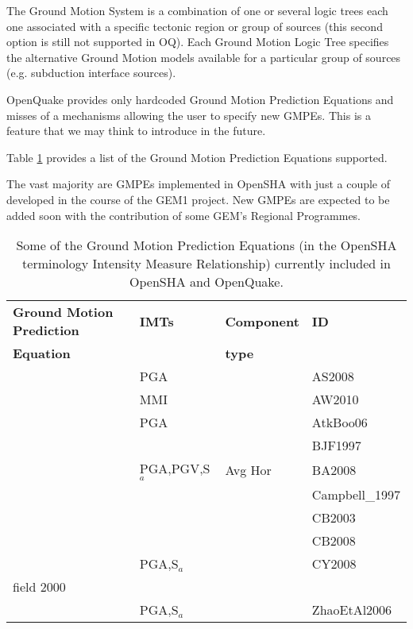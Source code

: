 The Ground Motion System is a combination of one or several logic 
trees each one associated with a specific tectonic region or group 
of sources (this second option is still not supported in OQ).
%
Each Ground Motion Logic Tree specifies the alternative Ground Motion 
models available for a particular group of sources (e.g. subduction 
interface sources).

OpenQuake provides only hardcoded Ground Motion Prediction Equations 
and misses of a mechanisms allowing the user to specify new GMPEs. 
This is a feature that we may think to introduce in the future. 

Table \ref{tab:OQ_GMPEs} provides a list of the Ground Motion Prediction 
Equations supported. 

The vast majority are GMPEs implemented in OpenSHA with just a couple 
of developed in the course of the GEM1 project. New GMPEs are expected 
to be added soon with the contribution of some GEM's Regional Programmes.
%
\begin{table}[!t]
\centering
\begin{tabular}{llll} \hline
\textbf{Ground Motion Prediction} & \textbf{IMTs} & \textbf{Component } & \textbf{ID} \\
\textbf{Equation}& & \textbf{type} & \\ 
\hline
\cite{abrahamson2008} & PGA & & AS2008 \\
\cite{allen2010} & MMI & & AW2010 \\
\cite{atkinson2006} & PGA & & AtkBoo06 \\
\cite{boore1997} &  &  & BJF1997 \\
\cite{boore2008} & PGA,PGV,S$_{a}$ & Avg Hor & BA2008 \\
\cite{campbell1997} &  &  & Campbell\_1997 \\
\cite{campbell2003} &  &  & CB2003 \\
\cite{campbell2008} &  &  & CB2008 \\
\cite{chiou2008} & PGA,S$_{a}$ &  & CY2008 \\
field 2000 &  &  &  \\
\cite{zhao2006} & PGA,S$_{a}$ &  & ZhaoEtAl2006 \\
\hline
\end{tabular}
\caption{Some of the Ground Motion Prediction Equations (in the OpenSHA 
terminology Intensity Measure Relationship) currently included in OpenSHA 
and OpenQuake.}
\label{tab:OQ_GMPEs}
\end{table}

